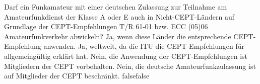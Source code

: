     {Darf ein Funkamateur mit einer deutschen Zulassung zur Teilnahme am Amateurfunkdienst der Klasse A oder E auch in Nicht-CEPT-Ländern auf Grundlage der CEPT-Empfehlungen T/R 61-01 bzw. ECC (05)06 Amateurfunkverkehr abwickeln?}
    {Ja, wenn diese Länder die entsprechende CEPT-Empfehlung anwenden.}
    {Ja, weltweit, da die ITU die CEPT-Empfehlungen für allgemeingültig erklärt hat.}
    {Nein, die Anwendung der CEPT-Empfehlungen ist Mitgliedern der CEPT vorbehalten.}
    {Nein, die deutsche Amateurfunkzulassung ist auf Mitglieder der CEPT beschränkt.}
    {false}{false}